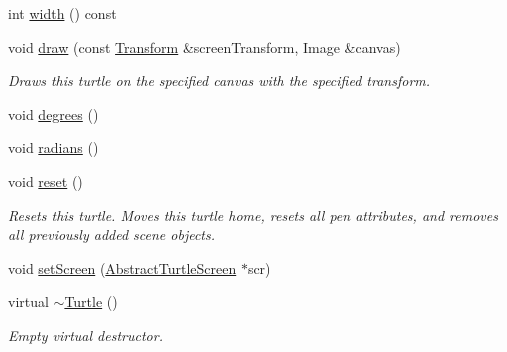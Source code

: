 \begin{DoxyCompactItemize}
\item 
int \hyperlink{classcturtle_1_1Turtle_af45bb9721decb8f091622863d337e9af}{width} () const
\item 
void \hyperlink{classcturtle_1_1Turtle_aac46b43327830632ac8e505e9d9f3d5f}{draw} (const \hyperlink{classcturtle_1_1Transform}{Transform} \&screen\+Transform, Image \&canvas)
\begin{DoxyCompactList}\small\item\em Draws this turtle on the specified canvas with the specified transform. \end{DoxyCompactList}\item 
void \hyperlink{classcturtle_1_1Turtle_aa68704b24017c6a8cda41ff292ecafde}{degrees} ()
\item 
void \hyperlink{classcturtle_1_1Turtle_a9c266e318f05dc5d45ddbeb830a373fa}{radians} ()
\item 
\mbox{\label{classcturtle_1_1Turtle_abdaaa776015722955a9193bebaaca4b3}} 
void \hyperlink{classcturtle_1_1Turtle_abdaaa776015722955a9193bebaaca4b3}{reset} ()
\begin{DoxyCompactList}\small\item\em Resets this turtle. Moves this turtle home, resets all pen attributes, and removes all previously added scene objects. \end{DoxyCompactList}\item 
void \hyperlink{classcturtle_1_1Turtle_a0f47c7d9a17258780d4d0134daf78522}{set\+Screen} (\hyperlink{classcturtle_1_1AbstractTurtleScreen}{Abstract\+Turtle\+Screen} $\ast$scr)
\item 
\mbox{\label{classcturtle_1_1Turtle_a7224baf1faed4dd203e09522507b9d3b}} 
virtual \hyperlink{classcturtle_1_1Turtle_a7224baf1faed4dd203e09522507b9d3b}{$\sim$\+Turtle} ()
\begin{DoxyCompactList}\small\item\em Empty virtual destructor. \end{DoxyCompactList}\end{DoxyCompactItemize}
